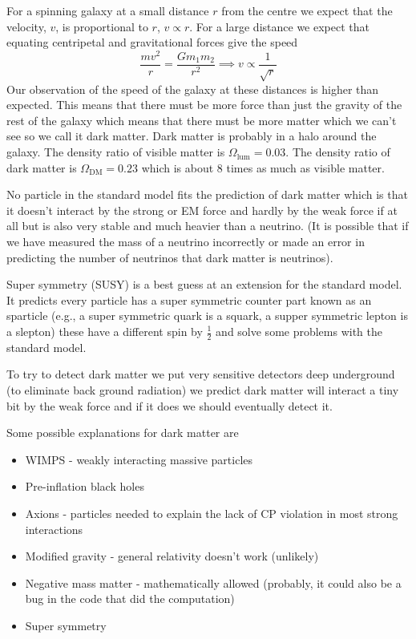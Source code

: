 For a spinning galaxy at a small distance \(r\) from the centre we expect that the velocity, \(v\), is proportional to \(r\), \(v\propto r\). For a large distance we expect that equating centripetal and gravitational forces give the speed
\[\frac{mv^2}{r}=\frac{Gm_1m_2}{r^2}\implies v\propto\frac{1}{\sqrt{r}}\]
Our observation of the speed of the galaxy at these distances is higher than expected. This means that there must be more force than just the gravity of the rest of the galaxy which means that there must be more matter which we can't see so we call it dark matter. Dark matter is probably in a halo around the galaxy. The density ratio of visible matter is \(\Omega_\mathrm{lum}=0.03\). The density ratio of dark matter is \(\Omega_\mathrm{DM}=0.23\) which is about 8 times as much as visible matter.

No particle in the standard model fits the prediction of dark matter which is that it doesn't interact by the strong or EM force and hardly by the weak force if at all but is also very stable and much heavier than a neutrino. (It is possible that if we have measured the mass of a neutrino incorrectly or made an error in predicting the number of neutrinos that dark matter is neutrinos).

Super symmetry (SUSY) is a best guess at an extension for the standard model. It predicts every particle has a super symmetric counter part known as an sparticle (e.g., a super symmetric quark is a squark, a supper symmetric lepton is a slepton) these have a different spin by \(\frac 12\) and solve some problems with the standard model.

To try to detect dark matter we put very sensitive detectors deep underground (to eliminate back ground radiation) we predict dark matter will interact a tiny bit by the weak force and if it does we should eventually detect it.

Some possible explanations for dark matter are
\begin{itemize}
\item WIMPS - weakly interacting massive particles
\item Pre-inflation black holes
\item Axions - particles needed to explain the lack of CP violation in most strong interactions
\item Modified gravity - general relativity doesn't work (unlikely)
\item Negative mass matter - mathematically allowed (probably, it could also be a bug in the code that did the computation)
\item Super symmetry
\end{itemize}

